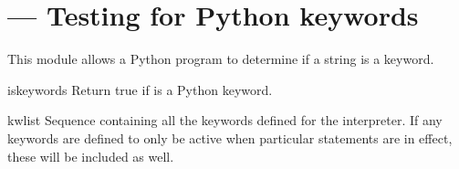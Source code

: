 \section{ ---
         Testing for Python keywords}



This module allows a Python program to determine if a string is a
keyword.

\begin{funcdesc}{iskeyword}{s}
Return true if  is a Python keyword.
\end{funcdesc}

\begin{datadesc}{kwlist}
Sequence containing all the keywords defined for the interpreter.  If
any keywords are defined to only be active when particular
 statements are in effect, these will be included
as well.
\end{datadesc}
